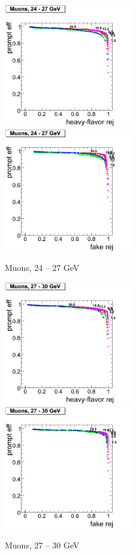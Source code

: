 \begin{figure}[htbp]
   \includegraphics[width = 0.5\textwidth]{pictures/bkgdRej_sigEff/muon_nonPrompt_ptCut7_ptCut8.png}
   \includegraphics[width = 0.5\textwidth]{pictures/bkgdRej_sigEff/muon_fake_ptCut7_ptCut8.png}
   \caption{Muons, 24 -- 27 GeV}
   \label{fig:muon_ptCut7_ptCut8}
\end{figure}

\begin{figure}[htbp]
   \includegraphics[width = 0.5\textwidth]{pictures/bkgdRej_sigEff/muon_nonPrompt_ptCut8_ptCut9.png}
   \includegraphics[width = 0.5\textwidth]{pictures/bkgdRej_sigEff/muon_fake_ptCut8_ptCut9.png}
   \caption{Muons, 27 -- 30 GeV}
   \label{fig:muon_ptCut8_ptCut9}
\end{figure}

